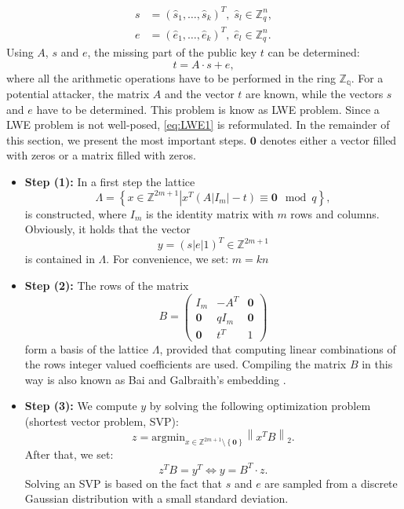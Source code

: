 \begin{align*}
s &= \left( \hat{s}_1, \ldots, \hat{s}_k \right)^T,\;\hat{s}_l \in \mathbb{Z}_q^{n}, \\
e &= \left( \hat{e}_1, \ldots, \hat{e}_k \right)^T,\;\hat{e}_l \in \mathbb{Z}_q^{n}.
\end{align*}
Using $A$, $s$ and $e$, the missing part of the public key $t$ can be determined:
\begin{equation}
    \label{eq:LWE1}
t = A \cdot s + e,
\end{equation}
where all the arithmetic operations have to be performed in the ring $\mathbb{Z_q}$. For a potential attacker, the matrix $A$ and the vector $t$ are known, while the vectors $s$ and $e$ have to be determined. This problem is know as LWE problem. Since a LWE problem is not well-posed, \eqref{eq:LWE1} is reformulated. In the remainder of this section, we present the most important steps. $\mathbf{0}$ denotes either a vector filled with zeros or a matrix filled with zeros.
\ \\
\begin{itemize}
    \item[]\textbf{Step (1):} In a first step the lattice 
    $$
    \Lambda = \left\{ \left. x \in \mathbb{Z}^{2m+1} \right| x^T \left( \left. A \right| \left. I_m \right| -t \right) \equiv \mathbf{0} \mod q \right\},
    $$
    is constructed, where $I_m$ is the identity matrix with $m$ rows and columns. Obviously, it holds that the vector
    $$
    y = \left( \left. s \right| \left. e \right| 1 \right)^T \in \mathbb{Z}^{2m+1}
    $$
    is contained in $\Lambda$. For convenience, we set: $m=kn$
    \ \\ 
    \item[]\textbf{Step (2):} The rows of the matrix 
    \begin{equation}
    \label{eq:LWE2}
    B = \begin{pmatrix} I_m & -A^T & \mathbf{0} \\ \mathbf{0} & q I_m & \mathbf{0} \\  \mathbf{0} & t^T & 1
    \end{pmatrix}
    \end{equation}
    form a basis of the lattice $\Lambda$, provided that computing linear combinations of the rows integer valued coefficients are used. Compiling the matrix $B$ in this way is also known as Bai and Galbraith’s embedding \cite{Albrecht17}. 
    \ \\
    \item[]\textbf{Step (3):} We compute $y$ by solving the following optimization problem (shortest vector problem, SVP):
    \begin{equation}
    \label{eq:LWE3}
    z = \text{argmin}_{x \in \mathbb{Z}^{2m+1} \setminus \left\{\mathbf{0}\right\}} \left\| x^T B \right\|_2.
    \end{equation}
    After that, we set:
    $$
    z^T B = y^T \Leftrightarrow y = B^T \cdot z.
    $$
    Solving an SVP is based on the fact that $s$ and $e$ are sampled from a discrete Gaussian distribution with a small standard deviation. 
\end{itemize}